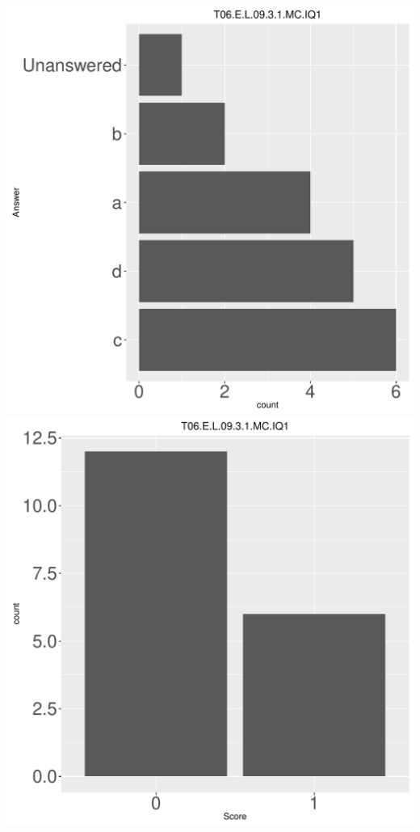 \documentclass[12pt,english,nohyper]{tufte-handout}\usepackage[]{graphicx}\usepackage[]{color}
\begin{document}
\begin{center} \includegraphics[width=.45\linewidth]{Topic06_AB_42_answer} \includegraphics[width=.45\linewidth]{Topic06_AB_42_score} \end{center} 
\end{document}
